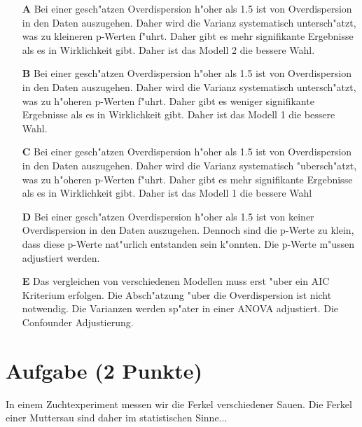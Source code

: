 \documentclass[a4paper, 10pt]{scrartcl}\usepackage[]{graphicx}\usepackage[]{xcolor}
\begin{document}
\begin{enumerate}
\item [\textbf{A} \msquare] Bei einer gesch{"a}tzen Overdispersion h{"o}her als 1.5 ist von Overdispersion in den Daten auszugehen. Daher wird die Varianz systematisch untersch{"a}tzt, was zu kleineren p-Werten f{"u}hrt. Daher gibt es mehr signifikante Ergebnisse als es in Wirklichkeit gibt. Daher ist das Modell 2 die bessere Wahl.
\item [\textbf{B} \msquare] Bei einer gesch{"a}tzen Overdispersion h{"o}her als 1.5 ist von Overdispersion in den Daten auszugehen. Daher wird die Varianz systematisch untersch{"a}tzt, was zu h{"o}heren p-Werten f{"u}hrt. Daher gibt es weniger signifikante Ergebnisse als es in Wirklichkeit gibt. Daher ist das Modell 1 die bessere Wahl.
\item [\textbf{C} \msquare] Bei einer gesch{"a}tzen Overdispersion h{"o}her als 1.5 ist von Overdispersion in den Daten auszugehen. Daher wird die Varianz systematisch {"u}bersch{"a}tzt, was zu h{"o}heren p-Werten f{"u}hrt. Daher gibt es mehr signifikante Ergebnisse als es in Wirklichkeit gibt. Daher ist das Modell 1 die bessere Wahl
\item [\textbf{D} \msquare] Bei einer gesch{"a}tzen Overdispersion h{"o}her als 1.5 ist von keiner Overdispersion in den Daten auszugehen. Dennoch sind die p-Werte zu klein, dass diese p-Werte nat{"u}rlich entstanden sein k{"o}nnten. Die p-Werte m{"u}ssen adjustiert werden.
\item [\textbf{E} \msquare] Das vergleichen von verschiedenen Modellen muss erst {"u}ber ein AIC Kriterium erfolgen. Die Absch{"a}tzung {"u}ber die Overdispersion ist nicht notwendig. Die Varianzen werden sp{"a}ter in einer ANOVA adjustiert. Die Confounder Adjustierung.
\end{enumerate}

\section{Aufgabe \hfill (2 Punkte)}

In einem Zuchtexperiment messen wir die Ferkel verschiedener Sauen. Die
Ferkel einer Muttersau sind daher im statistischen Sinne... 
\end{document}

